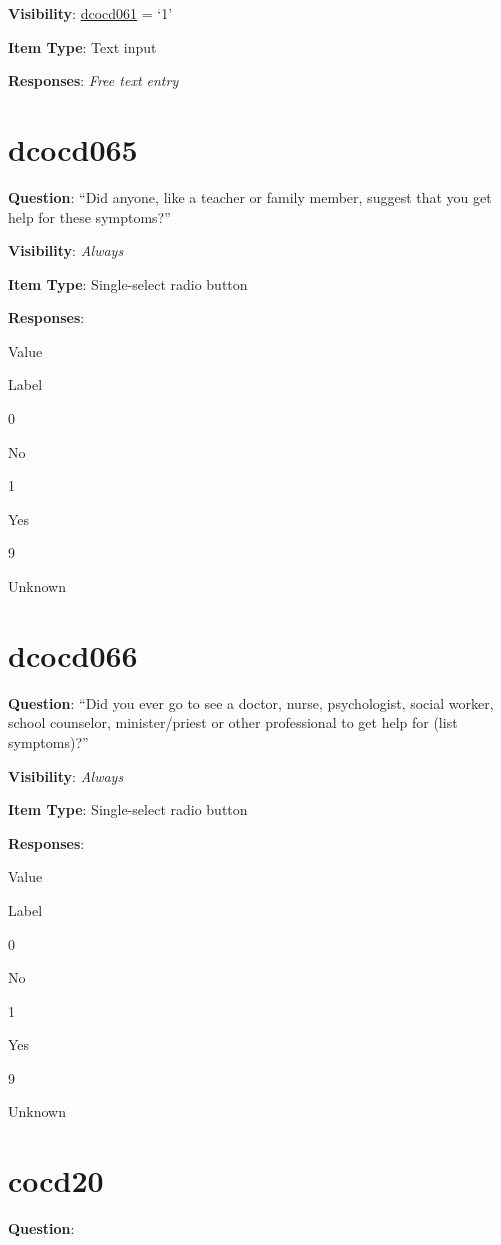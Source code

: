 \documentclass[]{book}
\begin{document}
\textbf{Visibility}: \protect\hyperlink{dcocd061}{dcocd061} = `1'

\textbf{Item Type}: Text input

\textbf{Responses}: \emph{Free text entry}

\hypertarget{dcocd065}{%
\section{dcocd065}\label{dcocd065}}

\textbf{Question}: ``Did anyone, like a teacher or family member, suggest that you get help for these symptoms?''

\textbf{Visibility}: \emph{Always}

\textbf{Item Type}: Single-select radio button

\textbf{Responses}:

Value

Label

0

No

1

Yes

9

Unknown

\hypertarget{dcocd066}{%
\section{dcocd066}\label{dcocd066}}

\textbf{Question}: ``Did you ever go to see a doctor, nurse, psychologist, social worker, school counselor, minister/priest or other professional to get help for (list symptoms)?''

\textbf{Visibility}: \emph{Always}

\textbf{Item Type}: Single-select radio button

\textbf{Responses}:

Value

Label

0

No

1

Yes

9

Unknown

\hypertarget{cocd20}{%
\section{cocd20}\label{cocd20}}

\textbf{Question}:
\end{document}
